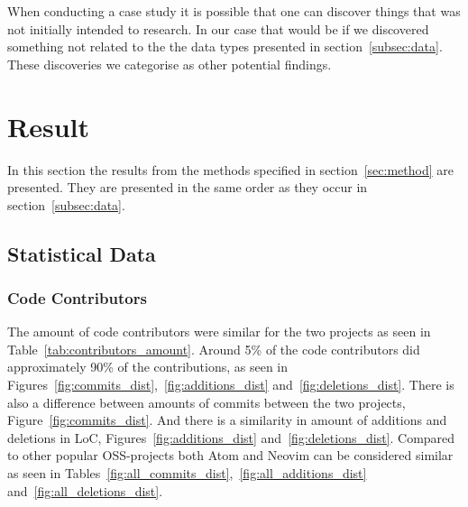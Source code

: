 \documentclass[a4paper,11pt]{article}
\begin{document}
{When conducting a case study it is possible that one can discover things that was not initially intended to research. In our case that would be if we discovered something not related to the the data types presented in section~\ref{subsec:data}. These discoveries we categorise as other potential findings.



\newpage
\section{Result}
In this section the results from the methods specified in section~\ref{sec:method} are presented. They are presented in the same order as they occur in section~\ref{subsec:data}.

\subsection{Statistical Data}
\label{stat_data}

\subsubsection{Code Contributors}
The amount of code contributors were similar for the two projects as seen in Table~\ref{tab:contributors_amount}. Around 5\% of the code contributors did approximately 90\% of the contributions, as seen in Figures~\ref{fig:commits_dist},~\ref{fig:additions_dist} and~\ref{fig:deletions_dist}. There is also a difference between amounts of commits between the two projects, Figure~\ref{fig:commits_dist}. And there is a similarity in amount of additions and deletions in LoC, Figures~\ref{fig:additions_dist} and~\ref{fig:deletions_dist}. Compared to other popular OSS-projects both Atom and Neovim can be considered similar as seen in Tables~\ref{fig:all_commits_dist},~\ref{fig:all_additions_dist} and~\ref{fig:all_deletions_dist}.

}
\end{document}
